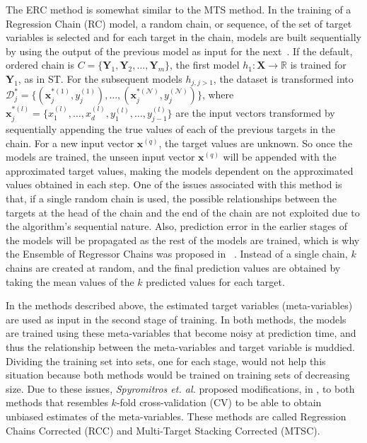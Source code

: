 \documentclass[preprint,12pt]{elsarticle}
\begin{document}
The ERC method is somewhat similar to the MTS method. In the training of a Regression Chain (RC) model, a random chain, or sequence, of the set of target variables is selected and for each target in the chain, models are built sequentially by using the output of the previous model as input for the next~\cite{Xioufis2016}. If the default, ordered chain is $C = \{\bm Y_1, \bm Y_2, \ldots, \bm Y_m\}$, the first model $h_1 : \bm X \rightarrow \mathbb{R}$ is trained for $\bm Y_1$, as in ST. For the subsequent models $h_{j,j>1}$, the dataset is transformed into $\mathcal{D}_j^* = \{(\bm x_j^{*(1)},y_j^{(1)}), \ldots, (\bm x_j^{*(\mathcal{N})},y_j^{(\mathcal{N})})\}$, where $\bm x_j^{*(l)} = \{x_1^{(l)}, \ldots, x_d^{(l)}, y_1^{(l)}, \ldots, y_{j-1}^{(l)}\}$ are the input vectors transformed by sequentially appending the true values of each of the previous targets in the chain. For a new input vector $\bm{x}^{(q)}$, the target values are unknown. So  once the models are trained, the unseen input vector $\bm{x}^{(q)}$ will be appended with the approximated target values, making the models dependent on the approximated values obtained in each step. One of the issues associated with this method is that, if a single random chain is used, the possible relationships between the targets at the head of the chain and the end of the chain are not exploited due to the algorithm's sequential nature. Also, prediction error in the earlier stages of the models will be propagated as the rest of the models are trained, which is why the Ensemble of Regressor Chains was proposed in ~\cite{Spyromitros2014}. Instead of a single chain, $k$ chains are created at random, and the final prediction values are obtained by taking the mean values of the $k$ predicted values for each target. 

In the methods described above, the estimated target variables (meta-variables) are used as input in the second stage of training. In both methods, the models are trained using these meta-variables that become noisy at prediction time, and thus the relationship between the meta-variables and target variable is muddied. Dividing the training set into sets, one for each stage, would not help this situation because both methods would be trained on training sets of decreasing size. Due to these issues, \textit{Spyromitros et. al.} proposed modifications, in \cite{Spyromitros2014}, to both methods that resembles $k$-fold cross-validation (CV) to be able to obtain unbiased estimates of the meta-variables. These methods are called Regression Chains Corrected (RCC) and Multi-Target Stacking Corrected (MTSC). 
\end{document}
